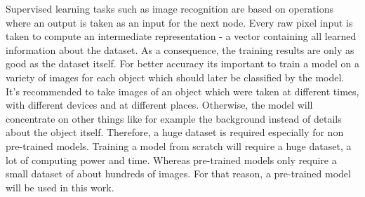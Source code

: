 Supervised learning tasks such as image recognition are based on operations where an output is taken as an input for the next node. Every raw pixel input is taken to compute an intermediate representation - a vector containing all learned information about the dataset. As a consequence, the training results are only as good as the dataset itself. For better accuracy its important to train a model on a variety of images for each object which should later be classified by the model. It's recommended to take images of an object which were taken at different times, with different devices and at different places. Otherwise, the model will concentrate on other things like for example the background instead of details about the object itself. Therefore, a huge dataset is required especially for non pre-trained models. Training a model from scratch will require a huge dataset, a lot of computing power and time. Whereas pre-trained models only require a small dataset of about hundreds of images. For that reason, a pre-trained model will be used in this work.